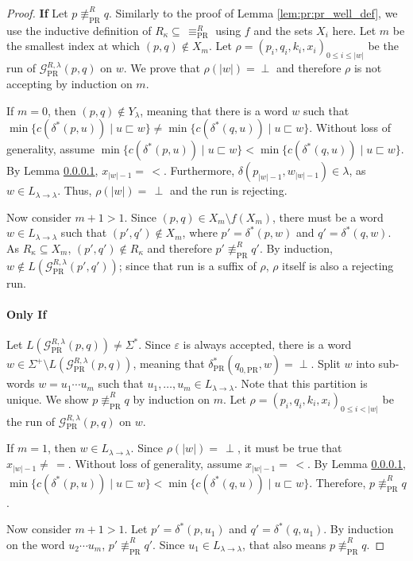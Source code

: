 \begin{proof}
	\textbf{If } Let $p \not\equiv_\text{PR}^R q$. Similarly to the proof of Lemma \ref{lem:pr:pr_well_def}, we use the inductive definition of $R_\kappa \subseteq\, \equiv_\text{PR}^R$ using $f$ and the sets $X_i$ here. Let $m$ be the smallest index at which $(p, q) \notin X_m$. Let $\rho = (p_i, q_i, k_i, x_i)_{0 \leq i \leq |w|}$ be the run of $\mathcal{G}_\text{PR}^{R,\lambda}(p, q)$ on $w$. We prove that $\rho(|w|) = \perp$ and therefore $\rho$ is not accepting by induction on $m$.
	
	If $m = 0$, then $(p, q) \notin Y_\lambda$, meaning that there is a word $w$ such that $\min \{ c(\delta^*(p, u)) \mid u \sqsubset w \} \neq \min \{ c(\delta^*(q, u)) \mid u \sqsubset w \}$. Without loss of generality, assume $\min \{ c(\delta^*(p, u)) \mid u \sqsubset w \} < \min \{ c(\delta^*(q, u)) \mid u \sqsubset w \}$. By Lemma \ref{}, $x_{|w|-1} =\, <$. Furthermore, $\delta(p_{|w|-1}, w_{|w|-1}) \in \lambda$, as $w \in L_{\lambda \rightarrow \lambda}$. Thus, $\rho(|w|) =\, \perp$ and the run is rejecting.
	
	Now consider $m+1 > 1$. Since $(p, q) \in X_m \setminus f(X_m)$, there must be a word $w \in L_{\lambda \rightarrow \lambda}$ such that $(p', q') \notin X_m$, where $p' = \delta^*(p, w)$ and $q' = \delta^*(q, w)$. As $R_\kappa \subseteq X_m$, $(p', q') \notin R_\kappa$ and therefore $p' \not\equiv_\text{PR}^R q'$. By induction, $w \notin L(\mathcal{G}_\text{PR}^{R,\lambda}(p', q'))$; since that run is a suffix of $\rho$, $\rho$ itself is also a rejecting run.
	
	\paragraph{Only If} Let $L(\mathcal{G}_\text{PR}^{R,\lambda}(p, q)) \neq \Sigma^*$. Since $\varepsilon$ is always accepted, there is a word $w \in \Sigma^+ \setminus L(\mathcal{G}_\text{PR}^{R,\lambda}(p, q))$, meaning that $\delta_\text{PR}^*(q_{0,\text{PR}}, w) = \perp$. Split $w$ into sub-words $w = u_1 \cdots u_m$ such that $u_1, \dots, u_m \in L_{\lambda \rightarrow \lambda}$. Note that this partition is unique. We show $p \not\equiv_\text{PR}^R q$ by induction on $m$. Let $\rho = (p_i, q_i, k_i, x_i)_{0 \leq i < |w|}$ be the run of $\mathcal{G}_\text{PR}^{R,\lambda}(p, q)$ on $w$.
	
	If $m = 1$, then $w \in L_{\lambda \rightarrow \lambda}$. Since $\rho(|w|) =\, \perp$, it must be true that $x_{|w|-1} \neq\, =$. Without loss of generality, assume $x_{|w|-1} =\, <$. By Lemma \ref{}, $\min \{ c(\delta^*(p, u)) \mid u \sqsubset w \} < \min \{ c(\delta^*(q, u)) \mid u \sqsubset w \}$. Therefore, $p \not\equiv_\text{PR}^R q$.
	
	Now consider $m+1 > 1$. Let $p' = \delta^*(p, u_1)$ and $q' = \delta^*(q, u_1)$. By induction on the word $u_2 \cdots u_m$, $p' \not\equiv_\text{PR}^R q'$. Since $u_1 \in L_{\lambda \rightarrow \lambda}$, that also means $p \not\equiv_\text{PR}^R q$.
\end{proof}

